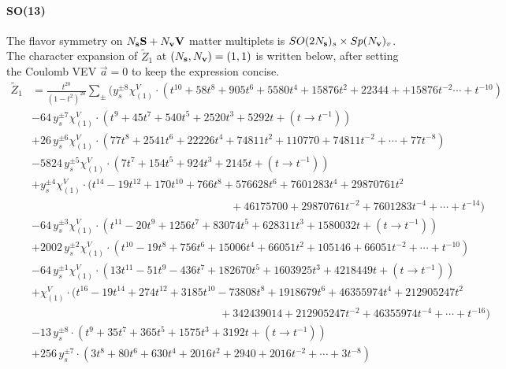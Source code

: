 \documentclass[letterpaper, 11pt]{article}
\newcommand{\nn}{\nonumber}
\begin{document}
{\paragraph{SO(13)} The flavor symmetry  on $N_{\bf s} \mathbf{S}+ N_{\bf v} \mathbf{V}$ matter multiplets is $SO(2N_{\bf s})_s \times  Sp(N_{\bf v})_v$. The character expansion of  $\tilde{Z}_1$ at $(N_{\bf s}, N_{\bf v}) = (1,1)$ is written below, after setting the Coulomb VEV $\vec{a} = 0$ to keep the expression concise. 
\begin{align}
  \label{eq:so13-s1v1}
  \tilde{Z}_1&=\frac{t^{20}}{(1-t^2)^{20}}\sum_{\pm}\Big(y_s^{\pm8}\chi^V_{(1)}\cdot (t^{10}+58 t^8+905 t^6+5580 t^4+15876 t^2+22344++15876 t^{-2} \cdots + t^{-10})\nn\\
  &-64\,y_s^{\pm7}\chi^V_{(1)} \cdot (t^9+45 t^7+540 t^5+2520 t^3+5292 t + (t\rightarrow t^{-1}))\nn\\
  &+26\,y_s^{\pm6}\chi^V_{(1)}\cdot (77 t^8+2541 t^6+22226 t^4+74811 t^2+110770 + 74811 t^{-2} + \cdots + 77 t^{-8})\nn\\
  &-5824\,y_s^{\pm5}\chi^V_{(1)} \cdot (7 t^7+154 t^5+924 t^3+2145 t + (t\rightarrow t^{-1}) )\nn\\
  &+y_s^{\pm4}\chi^V_{(1)} \cdot (t^{14}-19 t^{12}+170 t^{10}+766 t^8+576628 t^6 +7601283 t^4+29870761 t^2\nn\\
  &\qquad\qquad\qquad\qquad\qquad\qquad\qquad\qquad\qquad+46175700+ 29870761
  t^{-2} + 7601283 t^{-4}+\cdots +t^{-14})\nn\\
  &-64\,y_s^{\pm3}\chi^V_{(1)} \cdot (t^{11}-20 t^9+1256 t^7+83074 t^5+628311 t^3+1580032 t+ (t\rightarrow t^{-1}))\nn\\
  &+2002\,y_s^{\pm2}\chi^V_{(1)}\cdot (t^{10}-19 t^8+756 t^6+15006 t^4+66051 t^2+105146+66051 t^{-2} + \cdots + t^{-10})\nn\\
  &-64\,y_s^{\pm1}\chi^V_{(1)} \cdot (13 t^{11}-51 t^9-436 t^7+182670 t^5+1603925 t^3+4218449 t + (t\rightarrow t^{-1}))\nn\\
  &+\chi^V_{(1)} \cdot (t^{16}-19 t^{14}+274 t^{12}+3185 t^{10}-73808 t^8+1918679 t^6+46355974 t^4+212905247t^2\nn\\
  &\qquad\qquad\qquad\qquad\qquad\qquad\qquad\qquad\quad+342439014+212905247t^{-2}+46355974 t^{-4}+\cdots +t^{-16})\nn\\
  &-13\,y_s^{\pm8} \cdot (t^9+35 t^7+365 t^5+1575 t^3+3192 t+ (t\rightarrow t^{-1}))\nn\\
  &+256\,y_s^{\pm7}\cdot (3 t^8+80 t^6+630 t^4+2016
  t^2+2940+2016t^{-2}+\cdots+{3}t^{-8})\nn\\

\end{align}}
\end{document}
